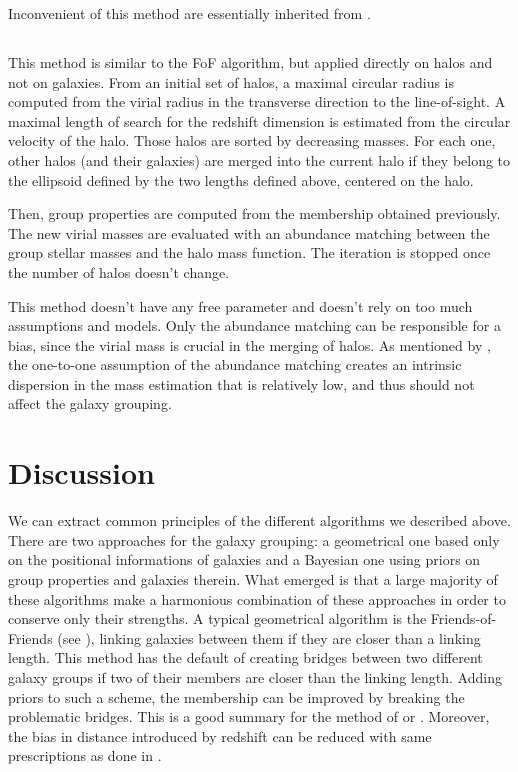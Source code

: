 Inconvenient of this method are essentially inherited from \citet{Yang+07}.

\subsection{\citet{MunozCuartas+12}}
\label{sub:munozcuartas12}

This method is similar to the FoF algorithm, but applied directly on halos and
not on galaxies. From an initial set of halos, a maximal circular radius is
computed from the virial radius in the transverse direction to the
line-of-sight. A maximal length of search for the redshift dimension is
estimated from the circular velocity of the halo. Those halos are sorted by
decreasing masses. For each one, other halos (and their galaxies) are merged
into the current halo if they belong to the ellipsoid defined by the two
lengths defined above, centered on the halo.

Then, group properties are computed from the membership obtained previously.
The new virial masses are evaluated with an abundance matching between the
group stellar masses and the halo mass function. The iteration is stopped once
the number of halos doesn't change.

This method doesn't have any free parameter and doesn't rely on too much
assumptions and models. Only the abundance matching can be responsible for a
bias, since the virial mass is crucial in the merging of halos. As mentioned by
\citet{Yang+07}, the one-to-one assumption of the abundance matching creates an
intrinsic dispersion in the mass estimation that is relatively low, and thus
should not affect the galaxy grouping.

\section{Discussion}
\label{sec:gga_discussion}

We can extract common principles of the different algorithms we described
above. There are two approaches for the galaxy grouping: a geometrical one
based only on the positional informations of galaxies and a Bayesian one using
priors on group properties and galaxies therein. What emerged is that a large
majority of these algorithms make a harmonious combination of these approaches
in order to conserve only their strengths. A typical geometrical algorithm is
the Friends-of-Friends (see ),
linking galaxies between them if they are closer than a linking length. This
method has the default of creating bridges between two different galaxy groups
if two of their members are closer than the linking length. Adding priors to
such a scheme, the membership can be improved by breaking the problematic
bridges. This is a good summary for the method of \citet{Marinoni+02} or
\citet{MunozCuartas+12}. Moreover, the bias in distance introduced by redshift
can be reduced with same prescriptions as done in \citet{Liu+08}.

